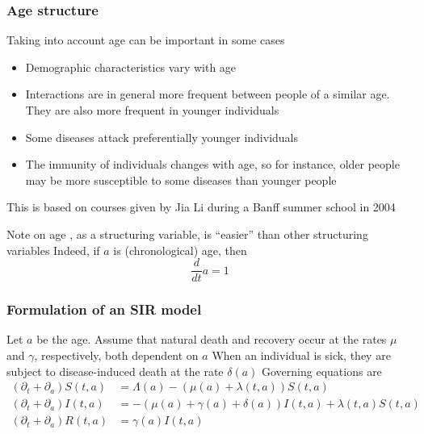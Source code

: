 \documentclass[aspectratio=169]{beamer}\usepackage[]{graphicx}\usepackage[]{xcolor}
\begin{document}
\begin{frame}\frametitle{Age structure}
Taking into account age can be important in some cases
\vfill
\begin{itemize}
\item Demographic characteristics vary with age
\item Interactions are in general more frequent between people of a similar age. They are also more frequent in younger individuals
\item Some diseases attack preferentially younger individuals
\item The immunity of individuals changes with age, so for instance, older people may be more susceptible to some diseases than younger people
\end{itemize}
\vfill
This is based on courses given by Jia Li during a Banff summer school in 2004 \nocite{li2008continuous}
\end{frame}

\nocite{brauer2008mathematical}

\begin{frame}{Note on age}
, as a structuring variable, is ``easier'' than other structuring variables
\vfill
Indeed, if $a$ is (chronological) age, then
\[
\frac{d}{dt}a = 1
\]
\end{frame}


\begin{frame}\frametitle{Formulation of an SIR model}
Let $a$ be the age. Assume that natural death and recovery occur at the rates $\mu$ and $\gamma$, respectively, both dependent on $a$
\vfill
When an individual is sick, they are subject to disease-induced death at the rate $\delta(a)$
\vfill
Governing equations are
\footnotesize
\begin{subequations}\label{sys:SIR_age_structure}
\begin{align}
(\partial_t+\partial_a)S(t,a) &=
\Lambda(a)-(\mu(a)+\lambda(t,a))S(t,a)
\label{sys:SIR_age_structure_S} \\
(\partial_t+\partial_a)I(t,a) &=
-(\mu(a)+\gamma(a)+\delta(a))I(t,a)+\lambda(t,a)S(t,a)
\label{sys:SIR_age_structure_I} \\
(\partial_t+\partial_a)R(t,a) &=
\gamma(a)I(t,a)
\label{sys:SIR_age_structure_R}
\end{align}
\end{subequations}
\end{frame}
\end{document}
